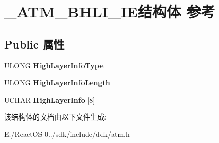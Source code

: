 \hypertarget{struct___a_t_m___b_h_l_i___i_e}{}\section{\+\_\+\+A\+T\+M\+\_\+\+B\+H\+L\+I\+\_\+\+I\+E结构体 参考}
\label{struct___a_t_m___b_h_l_i___i_e}
\subsection*{Public 属性}
\begin{DoxyCompactItemize}
\item 
\mbox{\label{struct___a_t_m___b_h_l_i___i_e_aae2a7f828285b7fdc494d7a11dd50450}} 
U\+L\+O\+NG {\bfseries High\+Layer\+Info\+Type}
\item 
\mbox{\label{struct___a_t_m___b_h_l_i___i_e_ab00121ea8d426d2409598f95de2ff06c}} 
U\+L\+O\+NG {\bfseries High\+Layer\+Info\+Length}
\item 
\mbox{\label{struct___a_t_m___b_h_l_i___i_e_a1cb46c44148b965f21a4be410b2938bd}} 
U\+C\+H\+AR {\bfseries High\+Layer\+Info} \mbox{[}8\mbox{]}
\end{DoxyCompactItemize}


该结构体的文档由以下文件生成\+:\begin{DoxyCompactItemize}
\item 
E\+:/\+React\+O\+S-\/0../sdk/include/ddk/atm.\+h\end{DoxyCompactItemize}
